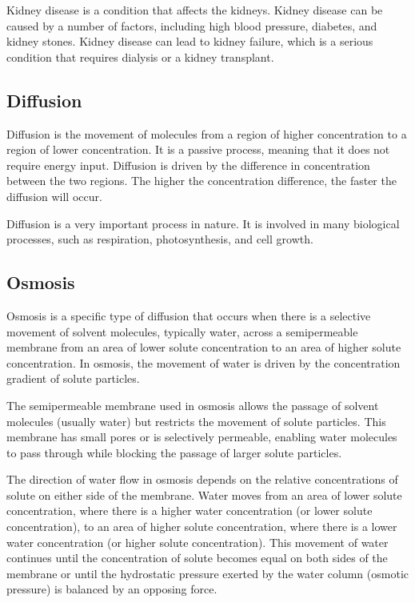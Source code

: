\documentclass[12pt, a4paper]{article} %
\begin{document}
\BgThispage
Kidney disease is a condition that affects the kidneys. Kidney disease can be caused by a number of factors, including high blood pressure, diabetes, and kidney stones. Kidney disease can lead to kidney failure, which is a serious condition that requires dialysis or a kidney transplant.

\subsection{Diffusion}

Diffusion is the movement of molecules from a region of higher concentration to a region of lower concentration. It is a passive process, meaning that it does not require energy input. Diffusion is driven by the difference in concentration between the two regions. The higher the concentration difference, the faster the diffusion will occur.

Diffusion is a very important process in nature. It is involved in many biological processes, such as respiration, photosynthesis, and cell growth.

\subsection{Osmosis}

Osmosis is a specific type of diffusion that occurs when there is a selective movement of solvent molecules, typically water, across a semipermeable membrane from an area of lower solute concentration to an area of higher solute concentration. In osmosis, the movement of water is driven by the concentration gradient of solute particles.

The semipermeable membrane used in osmosis allows the passage of solvent molecules (usually water) but restricts the movement of solute particles. This membrane has small pores or is selectively permeable, enabling water molecules to pass through while blocking the passage of larger solute particles.

The direction of water flow in osmosis depends on the relative concentrations of solute on either side of the membrane. Water moves from an area of lower solute concentration, where there is a higher water concentration (or lower solute concentration), to an area of higher solute concentration, where there is a lower water concentration (or higher solute concentration). This movement of water continues until the concentration of solute becomes equal on both sides of the membrane or until the hydrostatic pressure exerted by the water column (osmotic pressure) is balanced by an opposing force.
\end{document}
